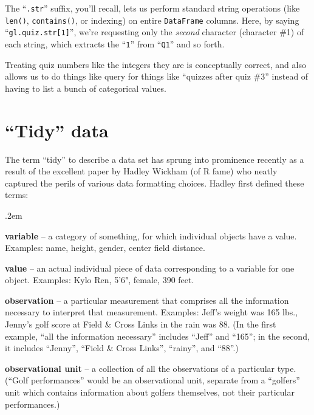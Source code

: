 \label{strSuffix}

The ``\texttt{.str}'' suffix, you'll recall, lets us perform standard string
operations (like \texttt{len()}, \texttt{contains()}, or indexing) on entire
\texttt{DataFrame} columns. Here, by saying ``\texttt{gl.quiz.str[1]}'', we're
requesting only the \textit{second} character (character \#1) of each string,
which extracts the ``\texttt{1}'' from ``\texttt{Q1}'' and so forth.

Treating quiz numbers like the integers they are is conceptually correct, and
also allows us to do things like query for things like ``quizzes after quiz
\#3'' instead of having to list a bunch of categorical values.

\section{``Tidy'' data}


The term ``tidy'' to describe a data set has sprung into prominence recently
as a result of the excellent paper by Hadley Wickham (of R fame) who neatly
captured the perils of various data formatting choices. Hadley first defined
these terms:

\begin{compactitem}
\itemsep.2em
\item \textbf{variable} -- a category of something, for which individual
objects have a value. Examples: name, height, gender, center field distance.
\item \textbf{value} -- an actual individual piece of data corresponding to a
variable for one object. Examples: Kylo Ren, 5'6", female, 390 feet.
\item \textbf{observation} -- a particular measurement that comprises all the
information necessary to interpret that measurement. Examples: Jeff's
weight was 165 lbs., Jenny's golf score at Field \& Cross Links in the rain
was 88. (In the first example, ``all the information necessary'' includes
``Jeff'' and ``165''; in the second, it includes ``Jenny'', ``Field \& Cross
Links'', ``rainy'', and ``88''.)
\item \textbf{observational unit} -- a collection of all the observations of a
particular type. (``Golf performances'' would be an observational unit,
separate from a ``golfers'' unit which contains information about golfers
themselves, not their particular performances.)
\end{compactitem}

